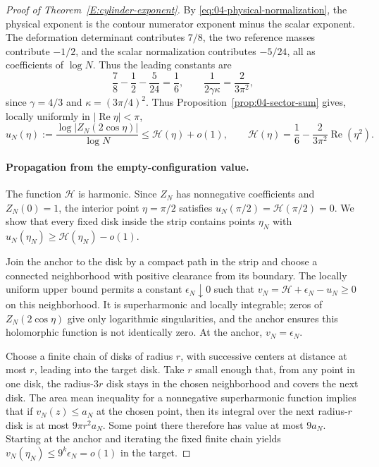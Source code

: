 \begin{proof}[Proof of Theorem~\ref{E:cylinder-exponent}]
By \eqref{eq:04-physical-normalization}, the physical exponent is the
contour numerator exponent minus the scalar exponent. The deformation
determinant contributes \(7/8\), the two reference masses contribute
\(-1/2\), and the scalar normalization contributes \(-5/24\), all
as coefficients of \(\log N\). Thus the leading constants are
\[
 \frac78-\frac12-\frac5{24}=\frac16,
 \qquad \frac1{2\gamma\kappa}=\frac2{3\pi^2},
\]
since \(\gamma=4/3\) and \(\kappa=(3\pi/4)^2\). Thus
Proposition~\ref{prop:04-sector-sum} gives, locally uniformly in
\(|\operatorname{Re}\eta|<\pi\),
\[
 u_N(\eta):=\frac{\log|Z_N(2\cos\eta)|}{\log N}
 \le\mathcal H(\eta)+o(1),\qquad
 \mathcal H(\eta)=\frac16-\frac{2}{3\pi^2}
                                  \operatorname{Re}(\eta^2).
\]
\paragraph{Propagation from the empty-configuration value.}
The function \(\mathcal H\) is harmonic. Since \(Z_N\) has
nonnegative coefficients and \(Z_N(0)=1\), the interior point
\(\eta=\pi/2\) satisfies \(u_N(\pi/2)=\mathcal H(\pi/2)=0\).
We show that every fixed disk inside the strip contains points
\(\eta_N\) with
\(u_N(\eta_N)\ge\mathcal H(\eta_N)-o(1)\).

Join the anchor to the disk by a compact path in the strip and
choose a connected neighborhood with positive clearance from its
boundary. The locally uniform upper bound permits a constant
\(\epsilon_N\downarrow0\) such that
\(v_N=\mathcal H+\epsilon_N-u_N\ge0\) on this neighborhood.
It is superharmonic and locally integrable; zeros of \(Z_N(2\cos\eta)\)
give only logarithmic singularities, and the anchor ensures this
holomorphic function is not identically zero. At the anchor,
\(v_N=\epsilon_N\).

Choose a finite chain of disks of radius \(r\), with successive
centers at distance at most \(r\), leading into the target disk.
Take \(r\) small enough that, from any point in one disk, the
radius-\(3r\) disk stays in the chosen neighborhood and covers the
next disk. The area mean inequality for a nonnegative superharmonic
function implies that if \(v_N(z)\le a_N\) at the chosen point,
then its integral over the next radius-\(r\) disk is at most
\(9\pi r^2a_N\). Some point there therefore has value at most
\(9a_N\). Starting at the anchor and iterating the fixed finite
chain yields \(v_N(\eta_N)\le9^k\epsilon_N=o(1)\) in the target.


\end{proof}
